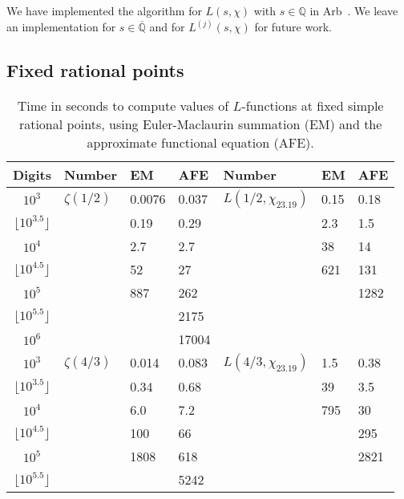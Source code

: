 \documentclass[reqno]{amsart}
\newcommand{\QQ}{\mathbb{Q}}
\theoremstyle{definition}
\begin{document}
\label{sect:implementation}

We have implemented the
algorithm for $L(s,\chi)$ with $s \in \QQ$ in Arb~\cite{Joh2017}.
We leave an implementation for $s \in \overline{\QQ}$ and for $L^{(j)}(s,\chi)$ for future work.

\subsection{Fixed rational points}

\begin{table}%
\setlength{\tabcolsep}{3pt}
\renewcommand{\arraystretch}{1.02}
\centering
\caption{\small
Time in seconds to compute values of $L$-functions at fixed simple rational points, using Euler-Maclaurin summation (EM) and the approximate functional equation (AFE).}
\label{tab:timeconst}
\small
\begin{tabular}{c | l l l | l l l}
 Digits                     & Number       & EM        & AFE     & Number & EM & AFE \\ \hline
 $10^3$                     & $\zeta(1/2)$ & 0.0076    & 0.037   &  $L(1/2, \chi_{23.19})$      & 0.15      & 0.18 \\
 $\lfloor 10^{3.5} \rfloor$ &              & 0.19      & 0.29    &        & 2.3       & 1.5  \\
 $10^4$                     &              & 2.7       & 2.7        &        & 38        & 14   \\
 $\lfloor 10^{4.5} \rfloor$ &              & 52        & 27         &        & 621       & 131    \\
 $10^{5}$                   &              & 887       & 262        &        &    & 1282   \\
 $\lfloor 10^{5.5} \rfloor$ &              &           & 2175       &        &    &    \\
 $10^{6}$                    &              &          & 17004     &        &    &    \\ \hline
 $10^3$                      & $\zeta(4/3)$ & 0.014    & 0.083 &  $L(4/3, \chi_{23.19})$  & 1.5       & 0.38 \\
 $\lfloor 10^{3.5} \rfloor$  & & 0.34      & 0.68      &     & 39        & 3.5  \\
 $10^4$                      & & 6.0       & 7.2       &  & 795       & 30   \\
 $\lfloor 10^{4.5} \rfloor$  & & 100       & 66        &      &           & 295    \\
 $10^{5}$                    & & 1808      & 618       &       &           & 2821   \\
 $\lfloor 10^{5.5} \rfloor$  & &           & 5242      &                     \\
\end{tabular}
\end{table}
\end{document}
